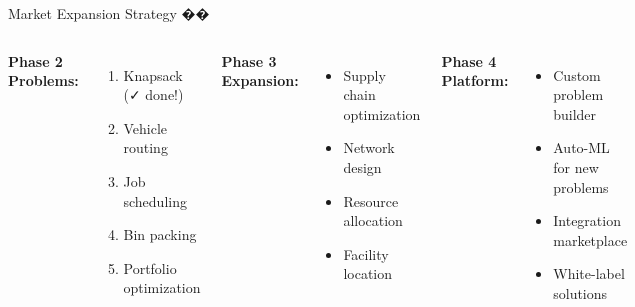 \documentclass[aspectratio=169]{beamer}
\begin{document}
\begin{frame}{Market Expansion Strategy ��}
\begin{columns}
\textbf{Phase 2 Problems:}
\begin{enumerate}
    \item Knapsack (✓ done!)
    \item Vehicle routing
    \item Job scheduling
    \item Bin packing
    \item Portfolio optimization
\end{enumerate}

\vspace{0.3cm}
\textbf{Phase 3 Expansion:}
\begin{itemize}
    \item Supply chain optimization
    \item Network design
    \item Resource allocation
    \item Facility location
\end{itemize}

\textbf{Phase 4 Platform:}
\begin{itemize}
    \item Custom problem builder
    \item Auto-ML for new problems
    \item Integration marketplace
    \item White-label solutions
\end{itemize}

\vspace{0.3cm}
\begin{center}
\end{center}
\end{columns}
\end{frame}

\end{document}
